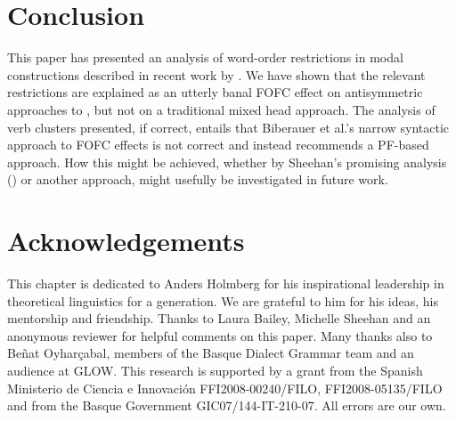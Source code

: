 \documentclass[output=paper]{langscibook}
\begin{document}
\section{Conclusion}\label{sec:haddican:5}
This paper has presented an analysis of word-order restrictions in  modal constructions described in recent work by \cite{etxepare-uribeetxebarria2009, etxepare-uribeetxebarria2012}.  We have shown that the relevant restrictions are explained as an utterly banal FOFC effect on antisymmetric approaches to , but not on a traditional mixed head approach.  The analysis of  verb clusters presented, if correct, entails that Biberauer et al.'s narrow syntactic approach to FOFC effects is not correct and instead recommends a PF-based approach. How this might be achieved, whether by Sheehan's promising analysis (\citeyear{Sheehan2013fofc, sheehan2013some}) or another approach, might usefully be investigated in future work.
	
\section*{Acknowledgements}
This chapter is dedicated to Anders Holmberg for his inspirational leadership in theoretical linguistics for a generation.  We are grateful to him for his ideas, his mentorship and friendship.  Thanks to Laura Bailey, Michelle Sheehan and an anonymous reviewer for helpful comments on this paper. Many thanks also to Beñat Oyhar\c cabal, members of the {Basque} Dialect Grammar team and an audience at GLOW. This research is supported by a grant from the Spanish Ministerio de Ciencia e Innovaci\'on FFI2008-00240/FILO, FFI2008-05135/FILO and from the {Basque} Government GIC07/144-IT-210-07. All errors are our own.



	
{\sloppy\printbibliography[heading=subbibliography,notkeyword=this]}
\end{document}
